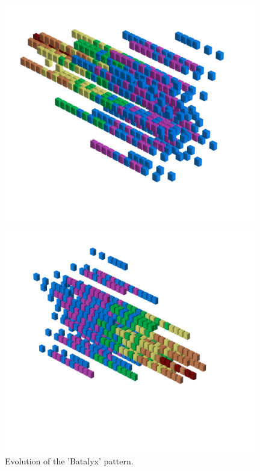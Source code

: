 \begin{figure}[H]
    \centering
    \begin{adjustbox}{width=11cm,center}
      \includegraphics[width=11cm]{src/batalyx_patterns/pattern0-45.png}%
    \end{adjustbox}
    \begin{adjustbox}{width=11cm,margin=0cm -2cm}
      \includegraphics[width=11cm]{src/batalyx_patterns/pattern0-225.png}%
    \end{adjustbox}
\caption{Evolution of the 'Batalyx' pattern.}
\end{figure}

